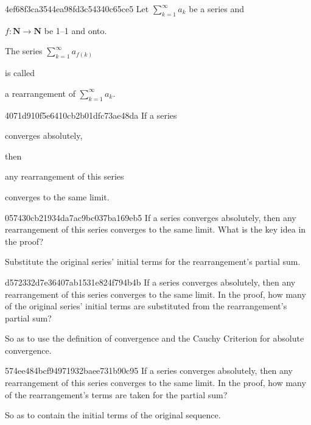 \begin{note}{4ef68f3ca3544ea98fd3c54340c65ce5}
    Let \({ \sum_{k=1}^{\infty} a_k }\) be a series and \begin{icloze}{3}\({ f : \mathbf{N} \to \mathbf{N} }\) be 1--1 and onto.\end{icloze}
    \begin{icloze}{2}The series \({ \sum_{k=1}^{\infty} a_{f(k)} }\)\end{icloze} is called \begin{icloze}{1}a rearrangement of \({ \sum_{k=1}^{\infty} a_k }\).\end{icloze}
\end{note}

\begin{note}{4071d910f5e6410cb2b01dfc73ae48da}
    If a series \begin{icloze}{2}converges absolutely,\end{icloze} then \begin{icloze}{3}any rearrangement of this series\end{icloze} \begin{icloze}{1}converges to the same limit.\end{icloze}
\end{note}

\begin{note}{057430cb21934da7ac9bc037ba169eb5}
    If a series converges absolutely, then any rearrangement of this series converges to the same limit.
    What is the key idea in the proof?

    \begin{cloze}{1}
        Substitute the original series' initial terms for the re\-ar\-range\-ment's partial sum.
    \end{cloze}
\end{note}

\begin{note}{d572332d7e36407ab1531e824f794b4b}
    If a series converges absolutely, then any rearrangement of this series converges to the same limit.
    In the proof, how many of the original series' initial terms are substituted from the rearrangement's partial sum?

    \begin{cloze}{1}
        So as to use the definition of convergence and the Cauchy Criterion for absolute convergence.
    \end{cloze}
\end{note}

\begin{note}{574ee484bcf94971932baee731b90c95}
    If a series converges absolutely, then any rearrangement of this series converges to the same limit.
    In the proof, how many of the rearrangement's terms are taken for the partial sum?

    \begin{cloze}{1}
        So as to contain the initial terms of the original sequence.
    \end{cloze}
\end{note}

